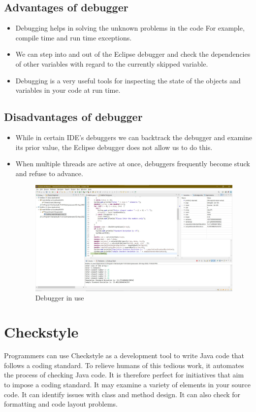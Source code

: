 \documentclass[12pt,a4paper]{report}
\begin{document}
\subsection{Advantages of debugger}
\begin{itemize}
    \item Debugging helps in solving the unknown problems in the code For example, compile time and run time exceptions.
    \item We can step into and out of the Eclipse debugger and check the dependencies of other variables with regard to the currently skipped variable.
    \item Debugging is a very useful tools for inspecting the state of the objects and variables in your code at run time.
\end{itemize}
\subsection{Disadvantages of debugger}
\begin{itemize}
    \item While in certain IDE's debuggers we can backtrack the debugger and examine its prior value, the Eclipse debugger does not allow us to do this.
    \item When multiple threads are active at once, debuggers frequently become stuck and refuse to advance.\\
    
\begin{figure}[h]
    \centering
    \includegraphics[width=0.90\linewidth]{Images/Debugger.jpg}
    \caption{Debugger in use}
    \label{fig:Debugger Image}
\end{figure}
\end{itemize}

\newpage
\section{Checkstyle}
Programmers can use Checkstyle as a development tool to write Java code that follows a coding standard. To relieve humans of this tedious work, it automates the process of checking Java code. It is therefore perfect for initiatives that aim to impose a coding standard. It may examine a variety of elements in your source code. It can identify issues with class and method design. It can also check for formatting and code layout problems.
\end{document}
